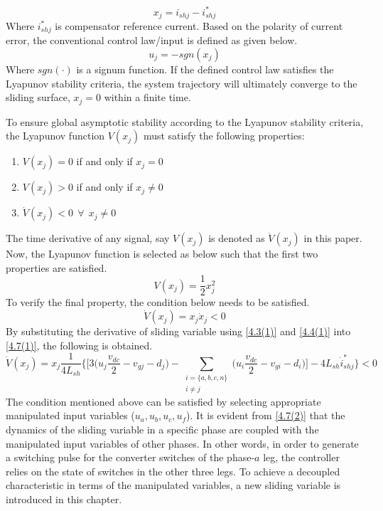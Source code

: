 \begin{equation} \label{4.4(1)}
	x_{j}  = i_{shj} - i^{*}_{shj}
\end{equation}
Where $i^{*}_{shj}$ is compensator reference current. Based on the polarity of current error, the conventional control law/input is defined as given below.
\begin{equation} \label{4.7(3)}
	u_{j} = - sgn(x_{j})
\end{equation}
Where $sgn(\cdot)$ is a signum function. If the defined control law satisfies the Lyapunov stability criteria, the system trajectory will ultimately converge to the sliding surface, $x_{j} = 0$ within a finite time.

To ensure global asymptotic stability according to the Lyapunov stability criteria, the Lyapunov function $V(x_{j})$ must satisfy the following properties:
\begin{enumerate}
	\item $V(x_{j}) = 0$ if and only if $x_{j} = 0$
	\item $V(x_{j}) > 0$ if and only if $x_{j} \neq 0$
	\item $\dot{V}(x_{j}) < 0 ~~ \forall ~~ x_{j} \neq 0$  
\end{enumerate}
The time derivative of any signal, say $V(x_{j})$ is denoted as $\dot{V}(x_{j})$ in this paper. Now, the Lyapunov function is selected as below such that the first two properties are satisfied.
\begin{equation} \label{4.6(1)}
	V(x_{j}) = \frac{1}{2} x_{j}^{2}
\end{equation}
To verify the final property, the condition below needs to be satisfied.
\begin{equation} \label{4.7(1)}
	\dot{V}(x_{j}) = x_{j} \dot{x}_{j} < 0
\end{equation}
By substituting the derivative of sliding variable using \eqref{4.3(1)} and \eqref{4.4(1)} into \eqref{4.7(1)}, the following is obtained.
\begin{equation} \label{4.7(2)}
		\dot{V}(x_{j}) = x_{j} \frac{1}{4L_{sh}}\bigg\{ \Big[3\Big(u_{j}\frac{v_{dc}}{2} - v_{gj} - d_{j} \Big) - \sum_{\substack{i=\{a,b,c,n\} \\ i \neq j}} \Big(u_{i}\frac{v_{dc}}{2} - v_{gi} -d_{i} \Big) \Big] -4L_{sh}\dot{i}^{*}_{shj}\bigg\} < 0  
\end{equation}
The condition mentioned above can be satisfied by selecting appropriate manipulated input variables ($u_{a},u_{b},u_{c},u_{f}$). It is evident from \eqref{4.7(2)} that the dynamics of the sliding variable in a specific phase are coupled with the manipulated input variables of other phases. In other words, in order to generate a switching pulse for the converter switches of the phase-$a$ leg, the controller relies on the state of switches in the other three legs. To achieve a decoupled characteristic in terms of the manipulated variables, a new sliding variable is introduced in this chapter.

